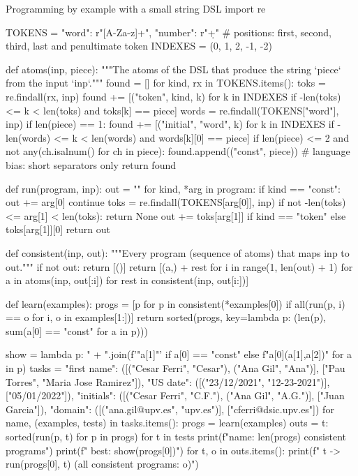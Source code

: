 \begin{pylisting}[label={lst:pbe}]{Programming by example with a small string DSL}
import re

TOKENS = {"word": r"[A-Za-z]+", "number": r"\d+"}
# positions: first, second, third, last and penultimate token
INDEXES = (0, 1, 2, -1, -2)

def atoms(inp, piece):
    """The atoms of the DSL that produce the string `piece` from the input `inp`."""
    found = []
    for kind, rx in TOKENS.items():
        toks = re.findall(rx, inp)
        found += [("token", kind, k) for k in INDEXES
                  if -len(toks) <= k < len(toks) and toks[k] == piece]
    words = re.findall(TOKENS["word"], inp)
    if len(piece) == 1:
        found += [("initial", "word", k) for k in INDEXES
                  if -len(words) <= k < len(words) and words[k][0] == piece]
    if len(piece) <= 2 and not any(ch.isalnum() for ch in piece):
        found.append(("const", piece))            # language bias: short separators only
    return found

def run(program, inp):
    out = ""
    for kind, *arg in program:
        if kind == "const":
            out += arg[0]
            continue
        toks = re.findall(TOKENS[arg[0]], inp)
        if not -len(toks) <= arg[1] < len(toks):
            return None
        out += toks[arg[1]] if kind == "token" else toks[arg[1]][0]
    return out

def consistent(inp, out):
    """Every program (sequence of atoms) that maps inp to out."""
    if not out:
        return [()]
    return [(a,) + rest for i in range(1, len(out) + 1)
            for a in atoms(inp, out[:i]) for rest in consistent(inp, out[i:])]

def learn(examples):
    progs = [p for p in consistent(*examples[0])
             if all(run(p, i) == o for i, o in examples[1:])]
    return sorted(progs, key=lambda p: (len(p), sum(a[0] == "const" for a in p)))

show = lambda p: " + ".join(f'"{a[1]}"' if a[0] == "const" else f"{a[0]}({a[1]},{a[2]})"
                            for a in p)
tasks = {"first name": ([("Cesar Ferri", "Cesar"), ("Ana Gil", "Ana")],
                        ["Pau Torres", "Maria Jose Ramirez"]),
         "US date": ([("23/12/2021", "12-23-2021")], ["05/01/2022"]),
         "initials": ([("Cesar Ferri", "C.F."), ("Ana Gil", "A.G.")], ["Juan Garcia"]),
         "domain": ([("ana.gil@upv.es", "upv.es")], ["cferri@dsic.upv.es"])}
for name, (examples, tests) in tasks.items():
    progs = learn(examples)
    outs = {t: sorted({run(p, t) for p in progs}) for t in tests}
    print(f"{name}: {len(progs)} consistent programs")
    print(f"    best: {show(progs[0])}")
    for t, o in outs.items():
        print(f"    {t} -> {run(progs[0], t)}   (all consistent programs: {o})")
\end{pylisting}
